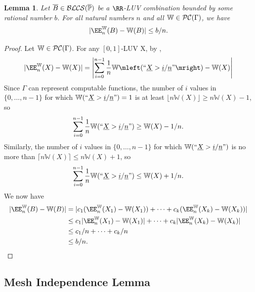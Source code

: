 \documentclass[authordate,onecolumn,noenvironments]{miri-tech-article}
\numberwithin{equation}{subsection}
\newtheorem{lemma}[theorem]{Lemma}
\newcommand{\quot}[1]{``#1"}
\newcommand{\enc}[1]{{\underline{#1}}}
\newcommand{\seq}[1]{{\overline{#1}}}
\newcommand{\representscomputations}{can represent computable functions}
\newcommand{\affluv}{B} %
\newcommand{\BLCS}[1][\MP]{\mathcal{B\-L\-C\-S}(#1)} %
\newcommand{\BelState}{\mathbb{P}}
\newcommand{\pt}{\BelState}
\newcommand{\MP}{\seq{\pt}}
\newcommand{\cworlds}{\mathcal{P\-C}} %
\newcommand{\World}{\mathbb{W}}
\newcommand{\Theory}{\Gamma}
\begin{document}
\begin{lemma}\label{lem:conluvapprox}
  Let $\seq\affluv \in \BLCS $ be a $\RR$-LUV combination bounded by some rational number $b$.
  For all natural numbers $n$ and all $\World \in \cworlds(\Theory)$, we have
  \[ | \EE_n^\World(\affluv) - \World(\affluv)| \leq b/n. \]
\end{lemma}
\begin{proof}

  Let $\World \in \cworlds(\Theory)$.  For any $[0, 1]$-LUV X, by ,
  \[
    |\EE_n^\World(X) - \World(X)| = \left|\sum_{i=0}^{n-1}\frac{1}{n} \World\mleft(\quot{\enc{X} > \enc{i}/\enc{n}} \mright) - \World(X) \right|
  \]
  Since $\Theory$ \representscomputations, the number of $i$ values in $\{0, \ldots, n-1\}$ for which $\World(\quot{\enc{X} > \enc{i}/\enc{n}}) = 1$ is at least $\lfloor n \World(X) \rfloor \geq n\World(X) - 1$, so
  \[
    \sum_{i=0}^{n-1}\frac{1}{n} \World\mleft(\quot{\enc{X} > \enc{i}/\enc{n}} \mright) \geq \World(X) - 1/n.
  \]
  Similarly, the number of $i$ values in $\{0, \ldots, n-1\}$ for which $\World(\quot{\enc{X} > \enc{i}/\enc{n}})$ is no more than $\lceil n\World(X)  \rceil \leq n\World(X) + 1$, so
  \[
    \sum_{i=0}^{n-1}\frac{1}{n} \World\mleft(\quot{\enc{X} > \enc{i}/\enc{n}} \mright) \leq \World(X) + 1/n.
  \]
  We now have
  \begin{align*}
    |\EE_n^\World(\affluv) - \World(\affluv)| &= |c_1 (\EE_n^\World(X_1) - \World(X_1)) + \cdots + c_k (\EE_n^\World(X_k) - \World(X_k))| 
    \\
    &\leq c_1 |\EE_n^\World(X_1) - \World(X_1)| + \cdots + c_k |\EE_n^\World(X_k) - \World(X_k)|
    \\
    &\leq c_1 /n + \cdots + c_k/n 
    \\
    &\leq b/n.
  \end{align*}
\end{proof}

\subsection{Mesh Independence Lemma}\label{app:mesh}
\end{document}
